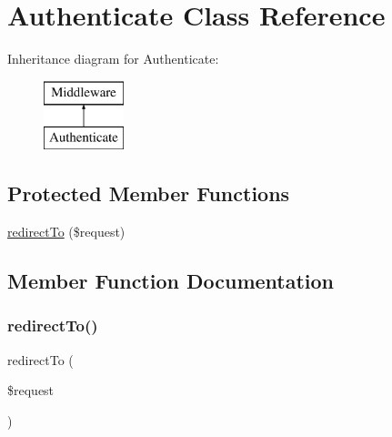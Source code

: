 \hypertarget{class_app_1_1_http_1_1_middleware_1_1_authenticate}{}\section{Authenticate Class Reference}
\label{class_app_1_1_http_1_1_middleware_1_1_authenticate}
Inheritance diagram for Authenticate\+:\begin{figure}[H]
\begin{center}
\leavevmode
\includegraphics[height=2.000000cm]{class_app_1_1_http_1_1_middleware_1_1_authenticate}
\end{center}
\end{figure}
\subsection*{Protected Member Functions}
\begin{DoxyCompactItemize}
\item 
\mbox{\hyperlink{class_app_1_1_http_1_1_middleware_1_1_authenticate_afb73afa067aa92166a43b0154f5e279a}{redirect\+To}} (\$request)
\end{DoxyCompactItemize}


\subsection{Member Function Documentation}
\mbox{\label{class_app_1_1_http_1_1_middleware_1_1_authenticate_afb73afa067aa92166a43b0154f5e279a}} 
\subsubsection{\texorpdfstring{redirectTo()}{redirectTo()}}
{\footnotesize\ttfamily redirect\+To (\begin{DoxyParamCaption}\item[{}]{\$request }\end{DoxyParamCaption})\hspace{0.3cm}{\ttfamily [protected]}}


